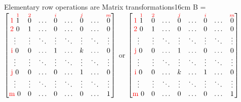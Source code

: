 \begin{definition}{Elementary row operations are Matrix transformations}{16cm}
        \hspace{1cm}
        B =
        $\begin{bmatrix}
            \text{\color{red} 1 } \overset{{\color{red} 1}}{1}
                & \overset{{\color{red} 2}}{0} & \hdots
                & \overset{{\color{red} i}}{0} & \hdots
                & \overset{{\color{red} j}}{0} & \hdots
                & \overset{{\color{red} m}}{0} \\
            \text{\color{red} 2 } 0 & 1 & \hdots & 0 & \hdots & 0 & \hdots & 0 \\
            \vdots & \vdots & \ddots & \vdots & \ddots & \vdots & \ddots & \vdots \\
            \text{\color{red} i } 0 & 0 & \hdots & 1 & \hdots & k & \hdots & 0 \\
            \vdots & \vdots & \ddots & \vdots & \ddots & \vdots & \ddots & \vdots \\
            \text{\color{red} j } 0 & 0 & \hdots & 0 & \hdots & 1 & \hdots & 0 \\
            \vdots & \vdots & \ddots & \vdots & \ddots & \vdots & \ddots & \vdots \\
            \text{\color{red} m } 0 & 0 & \hdots & 0 & \hdots & 0 & \hdots & 1
        \end{bmatrix}$
        or
        $\begin{bmatrix}
            \text{\color{red} 1 } \overset{{\color{red} 1}}{1}
                & \overset{{\color{red} 2}}{0} & \hdots
                & \overset{{\color{red} j}}{0} & \hdots
                & \overset{{\color{red} i}}{0} & \hdots
                & \overset{{\color{red} m}}{0} \\
            \text{\color{red} 2 } 0 & 1 & \hdots & 0 & \hdots & 0 & \hdots & 0 \\
            \vdots & \vdots & \ddots & \vdots & \ddots & \vdots & \ddots & \vdots \\
            \text{\color{red} j } 0 & 0 & \hdots & 1 & \hdots & 0 & \hdots & 0 \\
            \vdots & \vdots & \ddots & \vdots & \ddots & \vdots & \ddots & \vdots \\
            \text{\color{red} i } 0 & 0 & \hdots & k & \hdots & 1 & \hdots & 0 \\
            \vdots & \vdots & \ddots & \vdots & \ddots & \vdots & \ddots & \vdots \\
            \text{\color{red} m } 0 & 0 & \hdots & 0 & \hdots & 0 & \hdots & 1
        \end{bmatrix}$


\end{definition}
